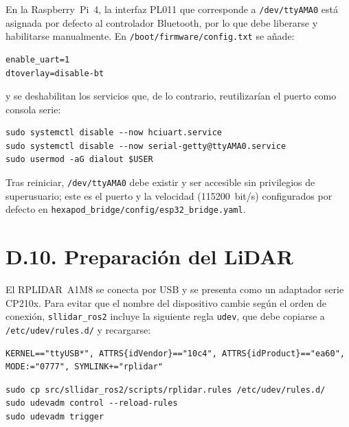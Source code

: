 En la Raspberry~Pi~4, la interfaz PL011 que corresponde a \texttt{/dev/ttyAMA0}
está asignada por defecto al controlador Bluetooth, por lo que debe liberarse y
habilitarse manualmente. En \texttt{/boot/firmware/config.txt} se añade:

\begin{lstlisting}[basicstyle=\ttfamily\small,frame=single]
enable_uart=1
dtoverlay=disable-bt
\end{lstlisting}

y se deshabilitan los servicios que, de lo contrario, reutilizarían el puerto
como consola serie:

\begin{lstlisting}[basicstyle=\ttfamily\small,frame=single,breaklines=true]
sudo systemctl disable --now hciuart.service
sudo systemctl disable --now serial-getty@ttyAMA0.service
sudo usermod -aG dialout $USER
\end{lstlisting}

Tras reiniciar, \texttt{/dev/ttyAMA0} debe existir y ser accesible sin
privilegios de superusuario; este es el puerto y la velocidad (115200~bit/s)
configurados por defecto en \texttt{hexapod\_bridge/config/esp32\_bridge.yaml}.

\noindent{}

\section*{D.10. Preparación del LiDAR}

El RPLIDAR~A1M8 se conecta por USB y se presenta como un adaptador serie
CP210x. Para evitar que el nombre del dispositivo cambie según el orden de
conexión, \texttt{sllidar\_ros2} \cite{sllidar_ros2} incluye la siguiente
regla \texttt{udev}, que debe copiarse a \texttt{/etc/udev/rules.d/} y
recargarse:

\begin{lstlisting}[basicstyle=\ttfamily\small,frame=single,breaklines=true]
KERNEL=="ttyUSB*", ATTRS{idVendor}=="10c4", ATTRS{idProduct}=="ea60", MODE:="0777", SYMLINK+="rplidar"
\end{lstlisting}

\begin{lstlisting}[basicstyle=\ttfamily\small,frame=single,breaklines=true]
sudo cp src/sllidar_ros2/scripts/rplidar.rules /etc/udev/rules.d/
sudo udevadm control --reload-rules
sudo udevadm trigger
\end{lstlisting}

